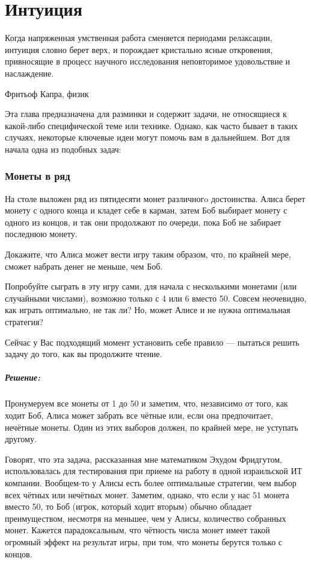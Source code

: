 \chapter*{Интуиция}
                                         

\epigraph{Когда напряженная
умственная  работа  сменяется  периодами  релаксации,  интуиция
словно  берет  верх,  и  порождает кристально ясные откровения,
привносящие  в  процесс  научного   исследования   неповторимое
удовольствие и наслаждение.}{Фритьоф Капра, физик}

Эта глава предназначена для разминки и  содержит задачи, не относящиеся к какой-либо специфической теме или технике. Однако, как часто бывает в таких случаях, некоторые  ключевые идеи могут помочь вам в дальнейшем.  Вот для начала одна из подобных задач:




\subsection*{Монеты в ряд} %


На столе выложен ряд из пятидесяти монет различногo достоинства. Алиса берет монету с одного конца и кладет себе в карман, затем Боб выбирает монету с одного из концов, и так они продолжают по очереди, пока Боб не забирает последнюю монету.

Докажите, что Алиса может вести игру таким образом, что, по крайней мере, сможет набрать денег не меньше, чем Боб.

\medskip

Попробуйте сыграть в эту игру сами, для начала с несколькими монетами (или случайными числами), возможно только с 4 или 6 вместо 50. 
Совсем неочевидно, как играть оптимально, не так ли?
Но, может Алисе и не нужна оптимальная стратегия? 

Сейчас у Вас подходящий момент установить себе правило --- пытаться решить задачу до того, как вы продолжите чтение.


\paragraph{Решение:}
Пронумеруем все монеты от 1 до 50 и заметим, что, независимо от того, как ходит Боб, Алиса может забрать все чётные или, если она предпочитает, нечётные монеты.
Один из этих выборов должен, по крайней мере, не уступать другому.
\heart


Говорят, что эта задача, рассказанная мне математиком  Эхудом Фридгутом, использовалась для тестирования при приеме на работу в одной израильской ИТ компании. 
Вообщем-то у Алисы есть более оптимальные стратегии, чем выбор всех чётных или нечётных монет.
Заметим, однако, что если у нас 51 монета вместо 50, то Боб (игрок, который ходит вторым) обычно обладает преимуществом, несмотря на меньшее, чем у Алисы, количество собранных монет.  
Кажется парадоксальным, что чётность числа монет имеет такой огромный эффект на результат игры, при том, что монеты берутся только с концов.


